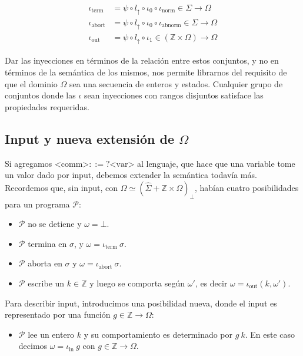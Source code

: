 \documentclass[a4paper, 12pt]{article}
\begin{document}
\begin{align*}
  \iota_{\text{term}} &= \psi \circ l_{\uparrow} \circ \iota_0 \circ
  \iota_\text{norm} \in \Sigma \to \Omega \\ 
  \iota_{\text{abort}} &= \psi \circ l_{\uparrow} \circ \iota_0 \circ
  \iota_\text{abnorm} \in \Sigma \to \Omega\\
  \iota_{\text{out}} &= \psi \circ l_{\uparrow} \circ \iota_1 \in (\mathbb{Z}
  \times \Omega) \to \Omega
\end{align*}

Dar las inyecciones en términos de la relación entre estos conjuntos, y no en
términos de la semántica de los mismos, nos permite librarnos del requisito de
que el dominio $\Omega$ sea una secuencia de enteros y estados. Cualquier grupo
de conjuntos donde las $\iota$ sean inyecciones con rangos disjuntos satisface
las propiedades requeridas.

\subsection{Input y nueva extensión de $\Omega$}

Si agregamos $\text{<comm>} ::= ?\text{<var>}$ al lenguaje, que hace que una
variable tome un valor dado por input, debemos extender la semántica todavía
más. Recordemos que, sin input, con $\Omega \simeq (\hat{\Sigma} + \mathbb{Z}
\times \Omega)_\bot $, habían cuatro posibilidades para un programa
$\mathcal{P}$:

\begin{itemize}
  \item $\mathcal{P}$ no se detiene y $\omega = \bot $.
  \item $\mathcal{P}$ termina en $\sigma$, y $\omega = \iota_{\text{term}} ~
    \sigma$. 
  \item $\mathcal{P}$ aborta en $\sigma$ y $\omega = \iota_{\text{abort}} ~
    \sigma$. 
  \item $\mathcal{P}$ escribe un $k \in \mathbb{Z}$ y luego se comporta según
    $\omega'$, es decir $\omega = \iota_{\text{out}}(k, \omega')$.
\end{itemize}

Para describir input, introducimos una posibilidad nueva, donde el input es
representado por una función $g \in \mathbb{Z} \to \Omega$:

\begin{itemize}
  \item $\mathcal{P}$ lee un entero $k$ y su comportamiento es determinado por
    $g ~ k$. En este caso decimos $\omega = \iota_{\text{in}} ~ g$ con $g \in
    \mathbb{Z} \to \Omega$.
\end{itemize}
\end{document}
